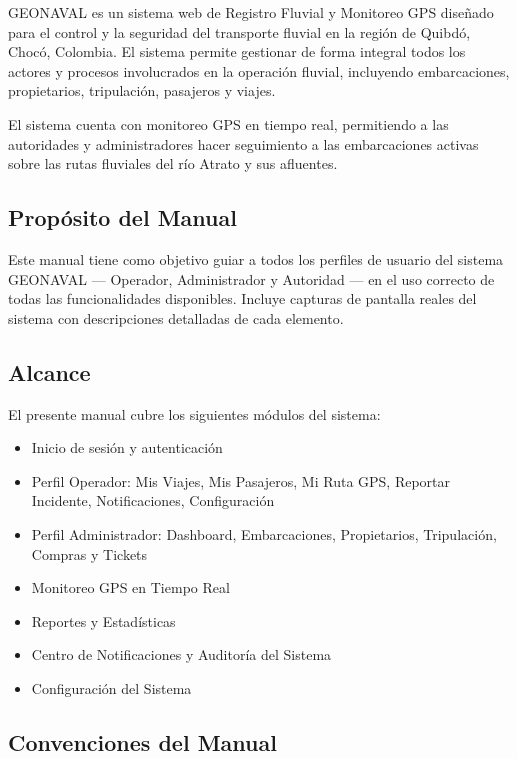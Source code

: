 \documentclass[12pt,a4paper]{article}
\begin{document}
GEONAVAL es un sistema web de Registro Fluvial y Monitoreo GPS diseñado para el control y la seguridad del transporte fluvial en la región de Quibdó, Chocó, Colombia. El sistema permite gestionar de forma integral todos los actores y procesos involucrados en la operación fluvial, incluyendo embarcaciones, propietarios, tripulación, pasajeros y viajes.

El sistema cuenta con monitoreo GPS en tiempo real, permitiendo a las autoridades y administradores hacer seguimiento a las embarcaciones activas sobre las rutas fluviales del río Atrato y sus afluentes.

\subsection{Propósito del Manual}

Este manual tiene como objetivo guiar a todos los perfiles de usuario del sistema GEONAVAL --- Operador, Administrador y Autoridad --- en el uso correcto de todas las funcionalidades disponibles. Incluye capturas de pantalla reales del sistema con descripciones detalladas de cada elemento.

\subsection{Alcance}

El presente manual cubre los siguientes módulos del sistema:

\begin{itemize}[leftmargin=1.5em]
  \item Inicio de sesión y autenticación
  \item Perfil Operador: Mis Viajes, Mis Pasajeros, Mi Ruta GPS, Reportar Incidente, Notificaciones, Configuración
  \item Perfil Administrador: Dashboard, Embarcaciones, Propietarios, Tripulación, Compras y Tickets
  \item Monitoreo GPS en Tiempo Real
  \item Reportes y Estadísticas
  \item Centro de Notificaciones y Auditoría del Sistema
  \item Configuración del Sistema
\end{itemize}

\subsection{Convenciones del Manual}
\end{document}
